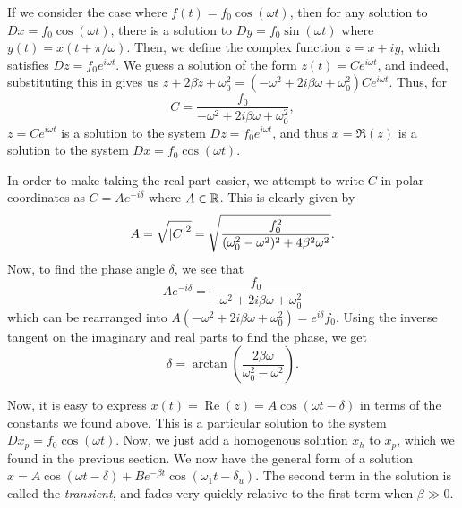 If we consider the case where $f(t) = f_0\cos(\omega t)$, then for any solution to $Dx = f_0\cos(\omega t)$, there is a solution to $Dy = f_0\sin(\omega t)$ where $y(t) = x(t + \pi/\omega)$. Then, we define the complex function $z = x + iy$, which satisfies $Dz = f_0e^{i\omega t}$. We guess a solution of the form $z(t) = Ce^{i\omega t}$, and indeed, substituting this in gives us $\ddot{z} + 2\beta \dot z + \omega_0^2 = (-\omega^2 + 2i\beta \omega + \omega_0^2)Ce^{i\omega t}$. Thus, for \[ C = \frac{f_0}{-\omega^2 + 2i\beta \omega + \omega_0^2},\] $z = Ce^{i\omega t}$ is a solution to the system $Dz = f_0e^{i\omega t}$, and thus $x = \Re(z)$ is a solution to the system $Dx = f_0\cos(\omega t)$.

In order to make taking the real part easier, we attempt to write $C$ in polar coordinates as $C = Ae^{-i\delta}$ where $A \in \mathbb R$. This is clearly given by \[A = \sqrt{\abs{C}^2} = \sqrt{\frac{f_0^2}{(\omega_0^2 - \omega^2)^2 + 4\beta^2 \omega^2}}.\] Now, to find the phase angle $\delta$, we see that \[Ae^{-i\delta} = \frac{f_0}{-\omega^2 + 2i\beta \omega + \omega_0^2}\] which can be rearranged into $A(-\omega^2 + 2i\beta \omega + \omega_0^2) = e^{i\delta}f_0$. Using the inverse tangent on the imaginary and real parts to find the phase, we get \[\delta = \arctan(\frac{2\beta \omega}{\omega_0^2 - \omega^2}).\] 

Now, it is easy to express $x(t) = \operatorname{Re}(z) = A\cos(\omega t - \delta)$ in terms of the constants we found above. This is a particular solution to the system $Dx_p = f_0\cos(\omega t)$. Now, we just add a homogenous solution $x_h$ to $x_p$, which we found in the previous section. We now have the general form of a solution $x = A\cos(\omega t - \delta) + Be^{-\beta t}\cos(\omega_1 t - \delta_u)$. The second term in the solution is called the \emph{transient}, and fades very quickly relative to the first term when $\beta \gg 0$.